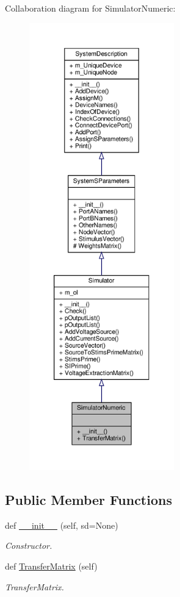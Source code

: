 Collaboration diagram for Simulator\+Numeric\+:\nopagebreak
\begin{figure}[H]
\begin{center}
\leavevmode
\includegraphics[height=550pt]{classSignalIntegrity_1_1SystemDescriptions_1_1SimulatorNumeric_1_1SimulatorNumeric__coll__graph}
\end{center}
\end{figure}
\subsection*{Public Member Functions}
\begin{DoxyCompactItemize}
\item 
def \hyperlink{classSignalIntegrity_1_1SystemDescriptions_1_1SimulatorNumeric_1_1SimulatorNumeric_a2fa2ae61a4511a760e2d2047ec07eb05}{\+\_\+\+\_\+init\+\_\+\+\_\+} (self, sd=None)
\begin{DoxyCompactList}\small\item\em Constructor. \end{DoxyCompactList}\item 
def \hyperlink{classSignalIntegrity_1_1SystemDescriptions_1_1SimulatorNumeric_1_1SimulatorNumeric_aecf838369a0d4e9037ba351539bd8eb1}{Transfer\+Matrix} (self)
\begin{DoxyCompactList}\small\item\em Transfer\+Matrix. \end{DoxyCompactList}\end{DoxyCompactItemize}
